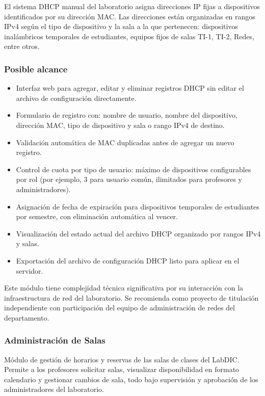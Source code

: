 El sistema DHCP manual del laboratorio asigna direcciones IP fijas a dispositivos 
identificados por su dirección MAC. Las direcciones están organizadas en rangos IPv4 
según el tipo de dispositivo y la sala a la que pertenecen: dispositivos inalámbricos 
temporales de estudiantes, equipos fijos de salas TI-1, TI-2, Redes, entre otros.

\subsubsection*{Posible alcance}

\begin{itemize}
	\item Interfaz web para agregar, editar y eliminar registros DHCP sin editar el 
	archivo de configuración directamente.
	\item Formulario de registro con: nombre de usuario, nombre del dispositivo, 
	dirección MAC, tipo de dispositivo y sala o rango IPv4 de destino.
	\item Validación automática de MAC duplicadas antes de agregar un nuevo registro.
	\item Control de cuota por tipo de usuario: máximo de dispositivos configurables 
	por rol (por ejemplo, 3 para usuario común, ilimitados para profesores y 
	administradores).
	\item Asignación de fecha de expiración para dispositivos temporales de 
	estudiantes por semestre, con eliminación automática al vencer.
	\item Visualización del estado actual del archivo DHCP organizado por rangos IPv4 
	y salas.
	\item Exportación del archivo de configuración DHCP listo para aplicar en el 
	servidor.
\end{itemize}

Este módulo tiene complejidad técnica significativa por su interacción con la 
infraestructura de red del laboratorio. Se recomienda como proyecto de titulación 
independiente con participación del equipo de administración de redes del 
departamento.

\subsubsection{Administración de Salas}

Módulo de gestión de horarios y reservas de las salas de clases del LabDIC. Permite 
a los profesores solicitar salas, visualizar disponibilidad en formato calendario y 
gestionar cambios de sala, todo bajo supervisión y aprobación de los administradores 
del laboratorio.

